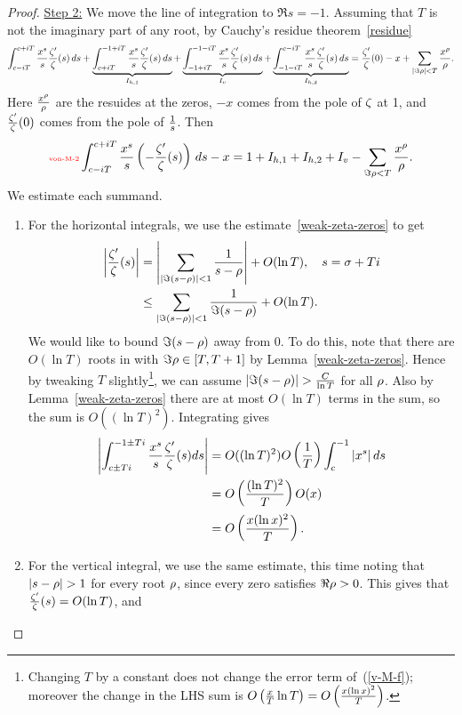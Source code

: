 \begin{proof}
\noindent\underline{Step 2:} We move the line of integration to $\Re s=-1$. Assuming that $T$ is not the imaginary part of any root, by Cauchy's residue theorem~\ref{residue} 
\[
\int_{c-iT}^{c+iT} \frac{x^s}{s}\frac{\zeta'}{\zeta}(s)\,ds
+\underbrace{\int_{c+iT}^{-1+iT} \frac{x^s}{s}\frac{\zeta'}{\zeta}(s)\,ds}_{I_{h,1}}
+\underbrace{\int_{-1+iT}^{-1-iT} \frac{x^s}{s}\frac{\zeta'}{\zeta}(s)\,ds}_{I_{v}}
+\underbrace{\int_{-1-iT}^{c-iT} \frac{x^s}{s}\frac{\zeta'}{\zeta}(s)\,ds}_{I_{h,2}}
=\frac{\zeta'}{\zeta}(0)-x+\sum_{|\Im\rho|<T}\frac{x^{\rho}}{\rho}.
\]
Here $\frac{x^{\rho}}{\rho}$ are the resuides at the zeros, $-x$ comes from the pole of $\zeta$ at 1, and $\frac{\zeta'}{\zeta}(0)$ comes from the pole of $\frac{1}{s}$.
Then
\begin{equation}\llabel{von-M-2}
\int_{c-iT}^{c+iT} \frac{x^s}{s}\pa{-\fc{\zeta'}{\ze}(s)}\,ds-x=1+I_{h,1}+I_{h,2}+I_v-\sum_{\Im\rh<T}\frac{x^{\rh}}{\rh}.
\end{equation}
We estimate each summand.
\begin{enumerate}
\item For the horizontal integrals, we use the estimate~\ref{weak-zeta-zeros} to get
\begin{align*}
\left| {\frac{\zeta'}{\zeta}(s)} \right|&=\left| {\sum_{|\Im(s-\rho)|<1} \frac{1}{s-\rho}} \right|+O(\ln T),\quad s=\sigma+Ti\\
&\le \sum_{|\Im(s-\rho)|<1}\frac{1}{\Im(s-\rho)}+O(\ln T).
\end{align*}
We would like to bound $\Im(s-\rho)$ away from 0. To do this, note that there are $O(\ln T)$ roots in with $\Im \rho\in [T,T+1]$ by Lemma~\ref{weak-zeta-zeros}. Hence by tweaking $T$ slightly\footnote{Changing $T$ by a constant does not change the error term of~(\ref{v-M-f}); moreover the change in the LHS sum is $O\left( {\frac{x}{T}\ln T} \right)=O\left( {\frac{x(\ln x)^2}{T}} \right)$.},
we can assume $|\Im(s-\rh)|>\frac{C}{\ln T}$ for all $\rho$. Also by Lemma~\ref{weak-zeta-zeros} there are at most $O(\ln T)$ terms in the sum, so the sum is $O((\ln T)^2)$.
Integrating gives
\begin{align*}
\ab{\int_{c\pm Ti}^{-1\pm Ti} \frac{x^s}{s}\frac{\ze'}{\ze}(s)ds}
&=O((\ln T)^2)O\prc T\int_{c}^{-1} |x^s|\,ds\\
&=O\pf{(\ln T)^2}{T}O(x)\\%
&=O\pf{x(\ln x)^2}{T}.
\end{align*}
\item For the vertical integral, we use the same estimate, this time noting that $|s-\rh|>1$ for every root $\rho$, since every zero satisfies $\Re \rho>0$. This gives that $\frac{\zeta'}{\zeta}(s)=O(\ln T )$, and

\end{enumerate}
\end{proof}
